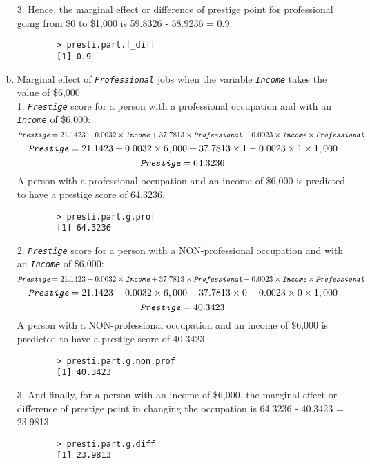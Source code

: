 \documentclass[12pt,letterpaper]{article}
\begin{document}
\begin{enumerate}[(a)]
		3. Hence, the marginal effect or difference of prestige point for professional going from \$0 to \$1,000 is 59.8326 - 58.9236 = 0.9.
		
		\begin{verbatim}
		> presti.part.f_diff
		[1] 0.9
		\end{verbatim}
		
		\item Marginal effect of \textit{\texttt{Professional}} jobs when the variable \textit{\texttt{Income}} takes the value of \$6,000 \\
		1. \textit{\texttt{Prestige}} score for a person with a professional occupation and with an \textit{\texttt{Income}} of \$6,000:
		$$\textit{\texttt{Prestige}} = 21.1423 + 0.0032 \times \textit{\texttt{Income}} + 37.7813 \times \textit{\texttt{Professional}} - 0.0023 \times \textit{\texttt{Income}} \times \textit{\texttt{Professional}}$$
		$$ \textit{\texttt{Prestige}} = 21.1423 + 0.0032 \times 6,000 + 37.7813 \times 1 - 0.0023 \times 1 \times 1,000 $$
		$$ \textit{\texttt{Prestige}} =  64.3236 $$
		A person with a professional occupation and an income of \$6,000 is predicted to have a prestige score of 64.3236.\\
		
		\begin{verbatim}
		> presti.part.g.prof
		[1] 64.3236
		\end{verbatim}
		
		2. \textit{\texttt{Prestige}} score for a person with a NON-professional occupation and with an \textit{\texttt{Income}} of \$6,000:
		$$\textit{\texttt{Prestige}} = 21.1423 + 0.0032 \times \textit{\texttt{Income}} + 37.7813 \times \textit{\texttt{Professional}} - 0.0023 \times \textit{\texttt{Income}} \times \textit{\texttt{Professional}}$$
		$$\textit{\texttt{Prestige}} = 21.1423 + 0.0032 \times 6,000 + 37.7813 \times 0 - 0.0023 \times 0 \times 1,000$$
		$$ \textit{\texttt{Prestige}} =  40.3423 $$
		A person with a NON-professional occupation and an income of \$6,000 is predicted to have a prestige score of 40.3423.\\
		
		\begin{verbatim}
		> presti.part.g.non.prof
		[1] 40.3423
		\end{verbatim}
	
		3. And finally, for a person with an income of \$6,000, the marginal effect or difference of prestige point in changing the occupation is 64.3236 - 40.3423 = 23.9813.
		
		\begin{verbatim}
		> presti.part.g.diff
		[1] 23.9813
		\end{verbatim}
	\end{enumerate}
\end{document}
